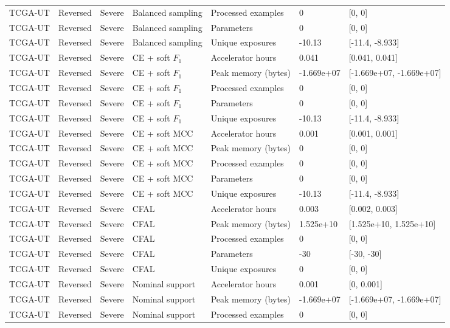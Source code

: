 \begin{longtable}{lllllll}
TCGA-UT & Reversed & Severe & Balanced sampling & Processed examples & 0 & [0, 0] \\
TCGA-UT & Reversed & Severe & Balanced sampling & Parameters & 0 & [0, 0] \\
TCGA-UT & Reversed & Severe & Balanced sampling & Unique exposures & -10.13 & [-11.4, -8.933] \\
TCGA-UT & Reversed & Severe & CE + soft $F_1$ & Accelerator hours & 0.041 & [0.041, 0.041] \\
TCGA-UT & Reversed & Severe & CE + soft $F_1$ & Peak memory (bytes) & -1.669e+07 & [-1.669e+07, -1.669e+07] \\
TCGA-UT & Reversed & Severe & CE + soft $F_1$ & Processed examples & 0 & [0, 0] \\
TCGA-UT & Reversed & Severe & CE + soft $F_1$ & Parameters & 0 & [0, 0] \\
TCGA-UT & Reversed & Severe & CE + soft $F_1$ & Unique exposures & -10.13 & [-11.4, -8.933] \\
TCGA-UT & Reversed & Severe & CE + soft MCC & Accelerator hours & 0.001 & [0.001, 0.001] \\
TCGA-UT & Reversed & Severe & CE + soft MCC & Peak memory (bytes) & 0 & [0, 0] \\
TCGA-UT & Reversed & Severe & CE + soft MCC & Processed examples & 0 & [0, 0] \\
TCGA-UT & Reversed & Severe & CE + soft MCC & Parameters & 0 & [0, 0] \\
TCGA-UT & Reversed & Severe & CE + soft MCC & Unique exposures & -10.13 & [-11.4, -8.933] \\
TCGA-UT & Reversed & Severe & CFAL & Accelerator hours & 0.003 & [0.002, 0.003] \\
TCGA-UT & Reversed & Severe & CFAL & Peak memory (bytes) & 1.525e+10 & [1.525e+10, 1.525e+10] \\
TCGA-UT & Reversed & Severe & CFAL & Processed examples & 0 & [0, 0] \\
TCGA-UT & Reversed & Severe & CFAL & Parameters & -30 & [-30, -30] \\
TCGA-UT & Reversed & Severe & CFAL & Unique exposures & 0 & [0, 0] \\
TCGA-UT & Reversed & Severe & Nominal support & Accelerator hours & 0.001 & [0, 0.001] \\
TCGA-UT & Reversed & Severe & Nominal support & Peak memory (bytes) & -1.669e+07 & [-1.669e+07, -1.669e+07] \\
TCGA-UT & Reversed & Severe & Nominal support & Processed examples & 0 & [0, 0] \\

\end{longtable}
